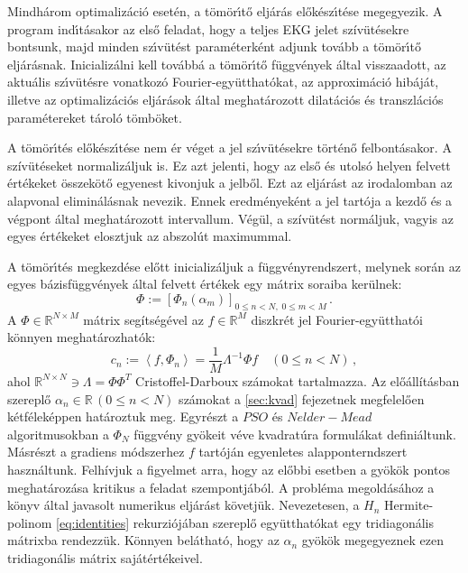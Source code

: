 \documentclass[oneside,titlepage,12pt,a4paper]{report}
\begin{document}
	Mindhárom optimaliz\'aci\'o eset\'en, a t\"om\"or\'\i t\H o
elj\'ar\'as el\H ok\'esz\'\i t\'ese megegyezik. A program ind\'\i t\'asakor az els\H o feladat,
hogy a teljes EKG jelet szív\"ut\'esekre bontsunk, majd
minden sz\'\i v\"ut\'est param\'eterk\'ent adjunk tov\'abb a t\"om\"or\'\i t\H o elj\'ar\'asnak. Inicializ\'alni kell tov\'abb\'a
a t\"om\"or\'\i t\H o f\"uggv\'enyek \'altal visszaadott, az aktuális sz\'\i v\"ut\'esre vonatkoz\'o Fourier-egy\"utthat\'okat, 
az approxim\'aci\'o hib\'aj\'at, illetve az optimaliz\'aci\'os elj\'ar\'asok \'altal meghat\'arozott dilat\'aci\'os \'es 
transzl\'aci\'os param\'etereket t\'aroló t\"omb\"oket. \par
	
A t\"om\"or\'\i t\'es el\H ok\'esz\'\i t\'ese nem \'er v\'eget a jel sz\'\i v\"ut\'esekre t\"ort\'en\H o felbont\'asakor. A szívütéseket normalizáljuk is. Ez azt jelenti, hogy az els\H o \'es utols\'o helyen felvett \'ert\'ekeket \"osszek\"ot\H o egyenest kivonjuk a jelb\H ol. Ezt az eljárást az irodalomban az alapvonal eliminálásnak nevezik. Ennek eredm\'enyek\'ent a jel tart\'oja a kezd\H o \'es a v\'egpont \'altal meghat\'arozott intervallum. Végül, a szívütést norm\'aljuk, vagyis az egyes \'ert\'ekeket 
elosztjuk az abszolút maximummal. \par
	A t\"om\"or\'\i t\'es megkezd\'ese el\H ott inicializ\'aljuk a f\"uggv\'enyrendszert, 
melynek során az egyes bázisf\"uggv\'enyek \'altal felvett \'ert\'ekek egy m\'atrix soraiba ker\"ulnek: 
\begin{equation*}
	\Phi:=\left[\Phi_n(\alpha_m)\right]_{0\leq n < N,\;0\leq m < M}\,.
	\label{eq:phi_matrix}
\end{equation*}
A $\Phi\in\mathbb{R}^{N\times M}$ mátrix segítségével az $f\in\mathbb{R}^M$ diszkrét jel Fourier-együtthatói könnyen meghatározhatók:
\begin{equation*}
	c_n:=\left\langle f, \Phi_n \right\rangle=\frac{1}{M} \Lambda^{-1} \Phi f \quad (0\leq n < N)\,,
	\label{eq:phi_coeffs}
\end{equation*}
ahol $\mathbb{R}^{N\times N}\ni\Lambda=\Phi \Phi^T$ Cristoffel-Darboux sz\'amokat tartalmazza. Az előállításban szereplő $\alpha_n\in\mathbb{R}\, (0\leq n < N)$ számokat a \ref{sec:kvad} fejezetnek megfelelően kétféleképpen határoztuk meg. Egyrészt a $PSO$ és $Nelder-Mead$ algoritmusokban a $\Phi_N$ függvény gyökeit véve kvadratúra formulákat definiáltunk. Másrészt a gradiens módszerhez $f$ tartóján egyenletes alapponterndszert használtunk. Felhívjuk a figyelmet arra, hogy az előbbi esetben a gyökök pontos meghatározása kritikus a feladat szempontjából. A probléma megoldásához a \cite{gautschi} könyv által javasolt numerikus eljárást követjük. Nevezetesen, a $H_n$ Hermite-polinom \eqref{eq:identities} rekurziójában szereplő együtthatókat egy tridiagonális mátrixba rendezzük. Könnyen belátható, hogy az $\alpha_n$ gyökök megegyeznek ezen tridiagonális mátrix sajátértékeivel.  \par
\end{document}
